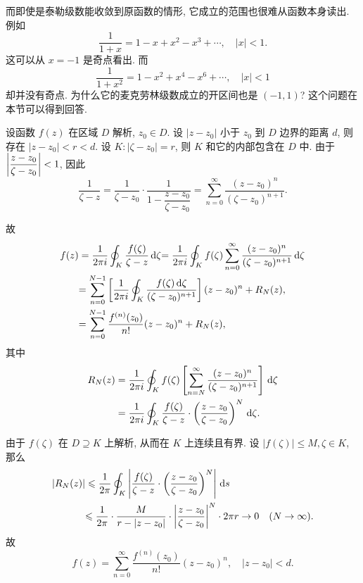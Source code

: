 \documentclass[nocolor,theme=doremi,lang=cn,11pt,chinese,twoside,openright,usesamecnt]{elegantbook}
\begin{document}
而即使是泰勒级数能收敛到原函数的情形, 它成立的范围也很难从函数本身读出.
例如
\[\dfrac1{1+x}=1-x+x^2-x^3+\cdots,\quad|x|<1.\]
这可以从 $x=-1$ 是奇点看出.
而
\[\dfrac1{1+x^2}=1-x^2+x^4-x^6+\cdots,\quad|x|<1\]
却并没有奇点.
为什么它的麦克劳林级数成立的开区间也是 $(-1,1)$?
这个问题在本节可以得到回答.

设函数 $f(z)$ 在区域 $D$ 解析, $z_0\in D$.
设 $|z-z_0|$ 小于 $z_0$ 到 $D$ 边界的距离 $d$,
则存在 $|z-z_0|<r<d$.
设 $K:|\zeta-z_0|=r$, 则 $K$ 和它的内部包含在 $D$ 中.
由于 $\left|\dfrac{z-z_0}{\zeta-z_0}\right|<1$, 因此
\[\frac1{\zeta-z}=\frac1{\zeta-z_0}\cdot\frac1{1-\dfrac{z-z_0}{\zeta-z_0}}=\sum_{n=0}^\infty\frac{(z-z_0)^n}{(\zeta-z_0)^{n+1}}.\]


\begin{center}
\end{center}

故
\begin{align*}
	f(z)&=\frac1{2\pi i}\oint_K \frac{f(\zeta)}{\zeta-z}\,\mathrm{d}\zeta
	{=\frac1{2\pi i}\oint_K f(\zeta)\sum_{n=0}^\infty\frac{(z-z_0)^n}{(\zeta-z_0)^{n+1}}\,\mathrm{d}\zeta}\\
	&{=
	\sum_{n=0}^{N-1}\left[\frac1{2\pi i}\oint_K\frac{f(\zeta)\,\mathrm{d}\zeta}{(\zeta-z_0)^{n+1}}\right](z-z_0)^n+R_N(z),}\\
	&{=
	\sum_{n=0}^{N-1}\frac{f^{(n)}(z_0)}{n!}(z-z_0)^n+R_N(z),}
\end{align*}
其中
\begin{align*}
	R_N(z)&=\frac1{2\pi i}\oint_Kf(\zeta)\left[\sum_{n=N}^\infty\frac{(z-z_0)^n}{(\zeta-z_0)^{n+1}}\right]\,\mathrm{d}\zeta\\
	&=\frac1{2\pi i}\oint_K\frac{f(\zeta)}{\zeta-z}\cdot\left(\frac{z-z_0}{\zeta-z_0}\right)^N\,\mathrm{d}\zeta.
\end{align*}

由于 $f(\zeta)$ 在 $D\supseteq K$ 上解析, 从而在 $K$ 上连续且有界.
设 $|f(\zeta)|\le M,\zeta\in K$,
那么
\begin{align*}
	|R_N(z)|&\leqslant\frac 1{2\pi}\oint_K\left|\frac{f(\zeta)}{\zeta-z}\cdot\left(\frac{z-z_0}{\zeta-z_0}\right)^N\right|\,\mathrm{d} s\\
	&{\leqslant\frac 1{2\pi}\cdot \frac M{r-|z-z_0|}\cdot\left|\frac{z-z_0}{\zeta-z_0}\right|^N\cdot 2\pi r\to 0\quad (N\to\infty).}
\end{align*}
故
\[f(z)=\sum_{n=0}^\infty\frac{f^{(n)}(z_0)}{n!}(z-z_0)^n,\quad |z-z_0|<d.\]
\end{document}
